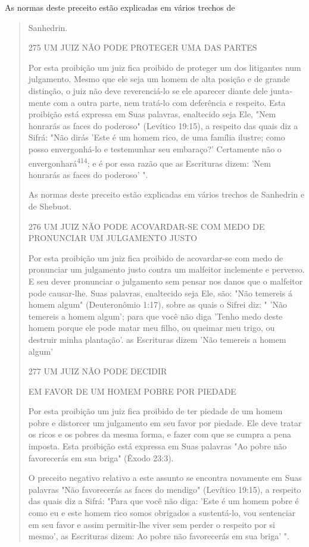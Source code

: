 As normas deste preceito estão explicadas em vários trechos de

\begin{quote}
Sanhedrin.

275 UM JUIZ NÃO PODE PROTEGER UMA DAS PARTES

Por esta proibição um juiz fica proibido de proteger um dos litigan­tes
num julgamento. Mesmo que ele seja um homem de alta posição e de gran­de
distinção, o juiz não deve reverenciá-lo se ele aparecer diante dele
junta­mente com a outra parte, nem tratá-lo com deferência e respeito.
Esta proibi­ção está expressa em Suas palavras, enaltecido seja Ele,
"Nem honrarás as faces do poderoso" (Levítico 19:15), a respeito das
quais diz a Sifrá: "Não dirás 'Este é um homem rico, de uma família
ilustre; como posso envergonhá-lo e teste­munhar seu embaraço?'
Certamente não o envergonhará\textsuperscript{414}; e é por essa razão
que as Escrituras dizem: 'Nem honrarás as faces do poderoso' ".

As normas deste preceito estão explicadas em vários trechos de
Sa­nhedrin e de Shebuot.

276 UM JUIZ NÃO PODE ACOVARDAR-SE COM MEDO DE PRONUNCIAR UM JULGAMENTO
JUSTO

Por esta proibição um juiz fica proibido de acovardar-se com medo de
pronunciar um julgamento justo contra um malfeitor inclemente e
perver­so. E seu dever pronunciar o julgamento sem pensar nos danos que
o malfeitor pode causar-lhe. Suas palavras, enaltecido seja Ele, são:
"Não temereis á homem algum" (Deuteronômio 1:17), sobre as quais o
Sifrei diz: " 'Não temereis a ho­mem algum'; para que você não diga
'Tenho medo deste homem porque ele pode matar meu filho, ou queimar meu
trigo, ou destruir minha plantação'. as Escrituras dizem 'Não temereis a
homem algum'

277 UM JUIZ NÃO PODE DECIDIR

EM FAVOR DE UM HOMEM POBRE POR PIEDADE

Por esta proibição um juiz fica proibido de ter piedade de um ho­mem
pobre e distorcer um julgamento em seu favor por piedade. Ele deve
tra­tar os ricos e os pobres da mesma forma, e fazer com que se cumpra a
pena imposta. Esta proibição está expressa em Suas palavras "Ao pobre
não favore­cerás em sua briga" (Êxodo 23:3).

O preceito negativo relativo a este assunto se encontra novamente em
Suas palavras "Não favorecerás as faces do mendigo" (Levítico 19:15), a
res­peito das quais diz a Sifrá: "Para que você não diga: 'Este é um
homem pobre é como eu e este homem rico somos obrigados a sustentá-lo,
vou sentenciar em seu favor e assim permitir-lhe viver sem perder o
respeito por si mesmo', as Escrituras dizem: Ao pobre não favorecerás em
sua briga' ".


\end{quote}
